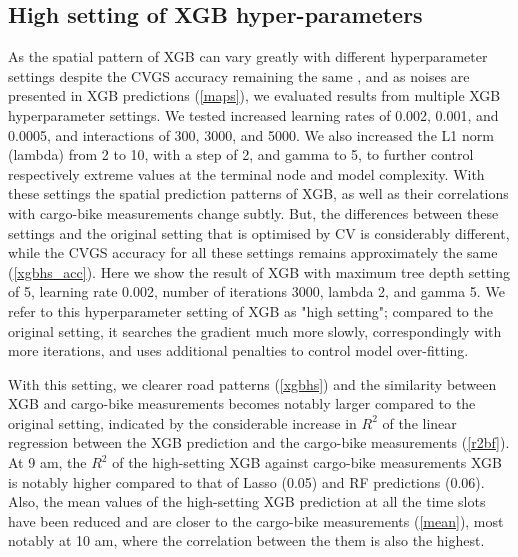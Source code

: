 \documentclass{article}
\begin{document}
\subsection{High setting of XGB hyper-parameters}
As the spatial pattern of XGB can vary greatly with different hyperparameter settings despite the CVGS accuracy remaining the same \citep{luglobal}, and as noises are presented in XGB predictions (\cref{maps}), we evaluated results from multiple XGB hyperparameter settings. We tested increased learning rates of 0.002, 0.001, and 0.0005, and interactions of 300, 3000, and 5000. We also increased the L1 norm (lambda) from 2 to 10, with a step of 2, and gamma \citep{chen2016xgboost} to 5, to further control respectively extreme values at the terminal node and model complexity. With these settings the spatial prediction patterns of XGB, as well as their correlations with cargo-bike measurements change subtly. But, the differences between these settings and the original setting that is optimised by CV is considerably different, while the CVGS accuracy for all these settings remains approximately the same (\cref{xgbhs_acc}). Here we show the result of XGB with maximum tree depth setting of 5, learning rate 0.002, number of iterations 3000, lambda 2, and gamma 5. We refer to this hyperparameter setting of XGB as "high setting"; compared to the original setting, it searches the gradient much more slowly, correspondingly with more iterations, and uses additional penalties to control model over-fitting. 

With this setting, we clearer road patterns (\cref{xgbhs}) and the similarity between XGB and cargo-bike measurements becomes notably larger compared to the original setting, indicated by the considerable increase in $R^2$ of the linear regression between the XGB prediction and the cargo-bike measurements (\cref{r2bf}). At 9 am, the $R^2$ of the high-setting XGB against cargo-bike measurements XGB is notably higher compared to that of Lasso (0.05) and RF predictions (0.06). Also, the mean values of the high-setting XGB prediction at all the time slots have been reduced and are closer to the cargo-bike measurements (\cref{mean}), most notably at 10 am, where the correlation between the them is also the highest. 
\end{document}
